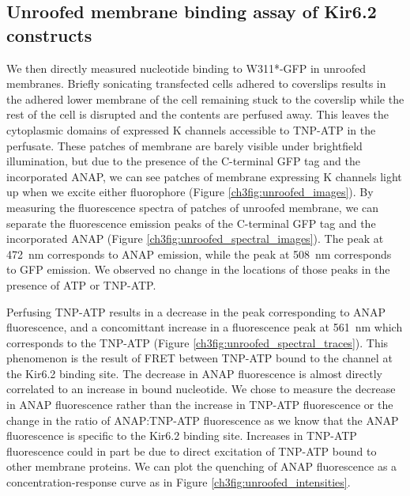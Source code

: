 \subsection{Unroofed membrane binding assay of Kir6.2 constructs}

We then directly measured nucleotide binding to W311*-GFP in unroofed membranes.
Briefly sonicating transfected cells adhered to coverslips results in the adhered lower membrane of the cell remaining stuck to the coverslip while the rest of the cell is disrupted and the contents are perfused away.
This leaves the cytoplasmic domains of expressed K\ATP{} channels accessible to TNP-ATP in the perfusate.
These patches of membrane are barely visible under brightfield illumination, but due to the presence of the C-terminal GFP tag and the incorporated ANAP, we can see patches of membrane expressing K\ATP{} channels light up when we excite either fluorophore (Figure \ref{ch3fig:unroofed_images}).
By measuring the fluorescence spectra of patches of unroofed membrane, we can separate the fluorescence emission peaks of the C-terminal GFP tag and the incorporated ANAP (Figure \ref{ch3fig:unroofed_spectral_images}).
The peak at \SI{472}{\nano\metre} corresponds to ANAP emission, while the peak at \SI{508}{\nano\metre} corresponds to GFP emission.
We observed no change in the locations of those peaks in the presence of ATP or TNP-ATP.

Perfusing TNP-ATP results in a decrease in the peak corresponding to ANAP fluorescence, and a concomittant increase in a fluorescence peak at \SI{561}{\nano\metre} which corresponds to the TNP-ATP (Figure \ref{ch3fig:unroofed_spectral_traces}).
This phenomenon is the result of FRET between TNP-ATP bound to the channel at the Kir6.2 binding site.
The decrease in ANAP fluorescence is almost directly correlated to an increase in bound nucleotide.
We chose to measure the decrease in ANAP fluorescence rather than the increase in TNP-ATP fluorescence or the change in the ratio of ANAP:TNP-ATP fluorescence as we know that the ANAP fluorescence is specific to the Kir6.2 binding site.
Increases in TNP-ATP fluorescence could in part be due to direct excitation of TNP-ATP bound to other membrane proteins.
We can plot the quenching of ANAP fluorescence as a concentration-response curve as in Figure \ref{ch3fig:unroofed_intensities}.

